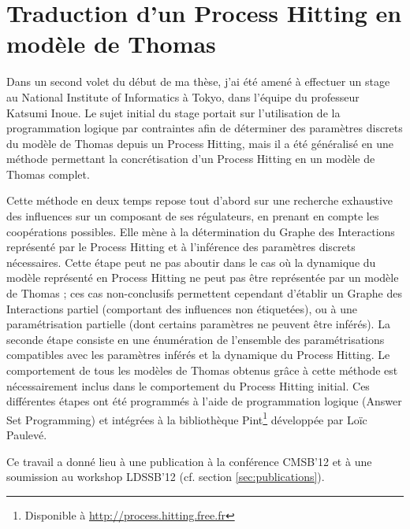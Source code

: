 
\section{Traduction d'un Process Hitting en modèle de Thomas}
Dans un second volet du début de ma thèse, j'ai été amené à effectuer un stage au National Institute of Informatics à Tokyo, dans l'équipe du professeur Katsumi Inoue.
Le sujet initial du stage portait sur l'utilisation de la programmation logique par contraintes afin de déterminer des paramètres discrets du modèle de Thomas depuis un Process Hitting, mais il a été généralisé en une méthode permettant la concrétisation d'un Process Hitting en un modèle de Thomas complet.

Cette méthode en deux temps repose tout d'abord sur une recherche exhaustive des influences sur un composant de ses régulateurs, en prenant en compte les coopérations possibles.
Elle mène à la détermination du Graphe des Interactions représenté par le Process Hitting et à l'inférence des paramètres discrets nécessaires.
Cette étape peut ne pas aboutir dans le cas où la dynamique du modèle représenté en Process Hitting ne peut pas être représentée par un modèle de Thomas ;
ces cas non-conclusifs permettent cependant d'établir un Graphe des Interactions partiel (comportant des influences non étiquetées), ou à une paramétrisation partielle (dont certains paramètres ne peuvent être inférés).
La seconde étape consiste en une énumération de l'ensemble des paramétrisations compatibles avec les paramètres inférés et la dynamique du Process Hitting.
Le comportement de tous les modèles de Thomas obtenus grâce à cette méthode est nécessairement inclus dans le comportement du Process Hitting initial.
Ces différentes étapes ont été programmés à l'aide de programmation logique (Answer Set Programming) et intégrées à la bibliothèque Pint\footnote{Disponible à \url{http://process.hitting.free.fr}} développée par Loïc Paulevé.

Ce travail a donné lieu à une publication à la conférence CMSB'12 et à une soumission au workshop LDSSB'12 (cf. section \ref{sec:publications}).
